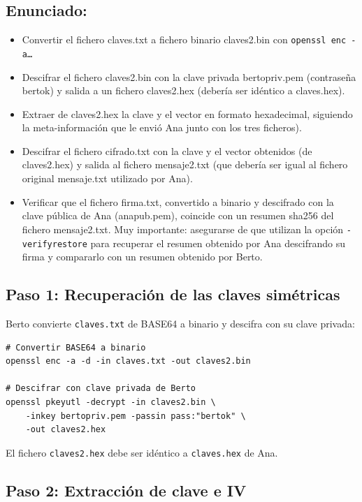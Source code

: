 \subsection{Enunciado:}
\begin{itemize}[label=\textbullet]
    \item Convertir el fichero claves.txt a fichero binario claves2.bin con \texttt{openssl enc -a\dots}
    \item Descifrar el fichero claves2.bin con la clave privada bertopriv.pem (contraseña bertok) y salida a un fichero claves2.hex (debería ser idéntico a claves.hex).
    \item Extraer de claves2.hex la clave y el vector en formato hexadecimal, siguiendo la meta-información que le envió Ana junto con los tres ficheros).
    \item Descifrar el fichero cifrado.txt con la clave y el vector obtenidos (de claves2.hex) y salida al fichero mensaje2.txt (que debería ser igual al fichero original mensaje.txt utilizado por Ana).
    \item Verificar que el fichero firma.txt, convertido a binario y descifrado con la clave pública de Ana (anapub.pem), coincide con un resumen sha256 del fichero mensaje2.txt. Muy importante: asegurarse de que utilizan la opción \texttt{-verifyrestore} para recuperar el resumen obtenido por Ana descifrando su firma y compararlo con un resumen obtenido por Berto.
\end{itemize}
\subsection{Paso 1: Recuperación de las claves simétricas}

Berto convierte \texttt{claves.txt} de BASE64 a binario y descifra con su clave privada:

\begin{lstlisting}[caption=Recuperación de claves por Berto]
# Convertir BASE64 a binario
openssl enc -a -d -in claves.txt -out claves2.bin

# Descifrar con clave privada de Berto
openssl pkeyutl -decrypt -in claves2.bin \
    -inkey bertopriv.pem -passin pass:"bertok" \
    -out claves2.hex
\end{lstlisting}

El fichero \texttt{claves2.hex} debe ser idéntico a \texttt{claves.hex} de Ana.

\subsection{Paso 2: Extracción de clave e IV}

